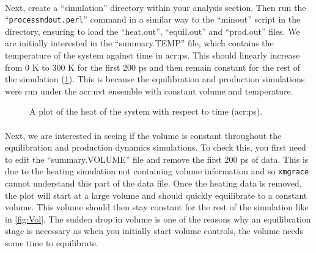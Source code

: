     \paragraph{}
        Next, create a \enquote{simulation} directory within your analysis section. Then run the \enquote{\texttt{process\textunderscore mdout.perl}} command in a similar way to the \enquote{minout} script in the directory, ensuring to load the \enquote{heat.out}, \enquote{equil.out} and \enquote{prod.out} files. We are initially interested in the \enquote{summary.TEMP} file, which contains the temperature of the system against time in \gls{acr:ps}. This should linearly increase from 0 K to 300 K for the first 200 ps and then remain constant for the rest of the simulation (\cref{fig:Temp}). This is because the equilibration and production simulations were run under the \gls{acr:nvt} ensemble with constant volume and temperature.

    \begin{figure}[H]
        \centering
        \caption{A plot of the heat of the system with respect to time (\gls{acr:ps}).}
        \label{fig:Temp}
    \end{figure}

    \paragraph{}
        Next, we are interested in seeing if the volume is constant throughout the equilibration and production dynamics simulations. To check this, you first need to edit the \enquote{summary.VOLUME} file and remove the first 200 ps of data. This is due to the heating simulation not containing volume information and so \texttt{xmgrace} cannot understand this part of the data file. Once the heating data is removed, the plot will start at a large volume and should quickly equilibrate to a constant volume. This volume should then stay constant for the rest of the simulation like in \cref{fig:Vol}. The sudden drop in volume is one of the reasons why an equilibration stage is necessary as when you initially start volume controls, the volume needs some time to equilibrate.

